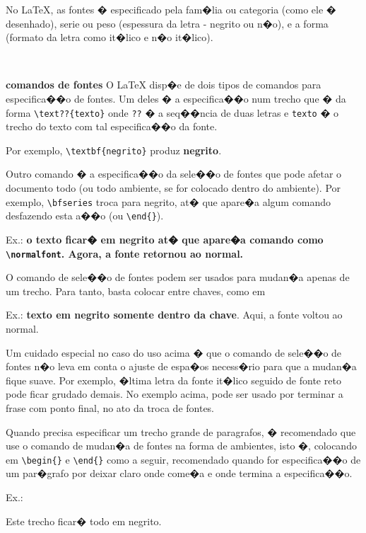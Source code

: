 \documentclass[12pt,a4paper]{article}
\begin{document}

No \LaTeX, as fontes � especificado pela fam�lia ou categoria 
(como ele � desenhado), serie ou peso (espessura da letra - negrito ou n�o), 
e a forma (formato da letra como it�lico e n�o it�lico).

\

{\bfseries comandos de fontes}
O \LaTeX{} disp�e de dois tipos de comandos para especifica��o de fontes.
Um deles � a especifica��o num trecho que � da forma
\verb+\text??{texto}+ onde \verb+??+ � a seq��ncia de duas letras
e \verb+texto+ � o trecho do texto com tal especifica��o da fonte.

Por exemplo, \verb+\textbf{negrito}+ produz \textbf{negrito}.

Outro comando � a especifica��o da sele��o de fontes que pode afetar 
o documento todo (ou todo ambiente, se for colocado dentro do ambiente).
Por exemplo, \verb+\bfseries+ troca para negrito, 
at� que apare�a algum comando desfazendo esta a��o
(ou \verb+\end{}+).

Ex.: \bfseries o texto ficar� em negrito at� que apare�a comando como
\verb+\normalfont+. 
\normalfont Agora, a fonte retornou ao normal.

O comando de sele��o de fontes podem ser usados para mudan�a apenas de 
um trecho. Para tanto, basta colocar entre chaves, como em

Ex.: {\bfseries texto em negrito somente dentro da chave}. 
Aqui, a fonte voltou ao normal.

Um cuidado especial no caso do uso acima � que o comando de sele��o 
de fontes n�o leva em conta o ajuste de espa�os necess�rio para que 
a mudan�a fique suave. Por exemplo, �ltima letra da fonte it�lico 
seguido de fonte reto pode ficar grudado demais. No exemplo acima, 
pode ser usado por terminar a frase com ponto final, 
no ato da troca de fontes.

Quando precisa especificar um trecho grande de paragrafos, 
� recomendado que use o comando de mudan�a de fontes 
na forma de ambientes, isto �, colocando em
\verb+\begin{}+ e \verb+\end{}+ como a seguir, 
recomendado quando for especifica��o de um par�grafo por deixar 
claro onde come�a e onde termina a especifica��o.

Ex.:
\begin{bfseries}
    Este trecho ficar� todo em negrito.
\end{bfseries}
\end{document}

